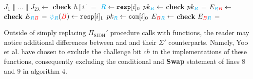 \begin{algorithm}[H]
\caption{-- }\label{alg:verifmath}
\begin{algorithmic}[1]
\State $J_{1} \parallel ... \parallel J_{2\lambda} \gets$ 
	\State \textbf{check} $h[i] =$ 
		\State $\textcolor{cyan}{R} \gets \texttt{resp}[i]_{0}$
		\State $pk_{\textcolor{cyan}{R}} \gets$ 
		\State \textbf{check} $pk_{\textcolor{cyan}{R}}$ = 
		\State $E_{\textcolor{cyan}{R}\textcolor{red}{B}} \gets$ 
		\State \textbf{check} $E_{\textcolor{cyan}{R}\textcolor{red}{B}}$ = 
	\Else
		\State $\textcolor{cyan}{\psi_R}(\textcolor{red}{B}) \gets \texttt{resp}[i]_{1}$
		\State $pk_{\textcolor{cyan}{R}} \gets \texttt{com}[i]_{0}$
		\State $E_{\textcolor{red}{B}\textcolor{cyan}{R}} \gets$ 
		\State \textbf{check} $E_{\textcolor{red}{B}\textcolor{cyan}{R}}$ = 
	\EndIf
\EndFor

	\State {}
\Else
	\State {}
\EndIf
\end{algorithmic}
\end{algorithm}

Outside of simply replacing $\Pi_{\text{SIDH}}'$ procedure calls with \sidh functions, the reader may notice additional differences between  and  and their $\Sigma'$ counterparts. Namely, Yoo et al. have chosen to exclude the challenge bit $ch$ in the \sidh implementations of these functions, consequently excluding the conditional and \textbf{Swap} statement of lines 8 and 9 in algorithm 4. 


